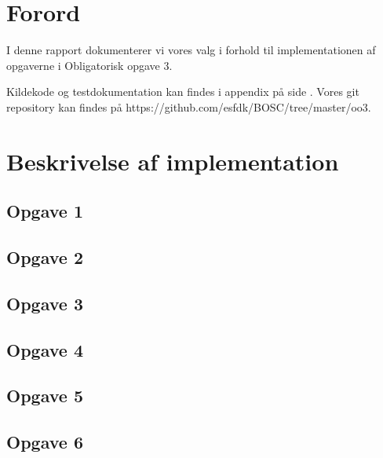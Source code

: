 \chapter{Forord}
I denne rapport dokumenterer vi vores valg i forhold til implementationen af opgaverne i Obligatorisk opgave 3.

Kildekode og testdokumentation kan findes i appendix på side \pageref{Appendix}. Vores git repository kan findes på https://github.com/esfdk/BOSC/tree/master/oo3.

\chapter{Beskrivelse af implementation}
\section{Opgave 1}
\label{O1}

\section{Opgave 2}
\label{O2}

\section{Opgave 3}
\label{O3}

\section{Opgave 4}
\label{O4}

\section{Opgave 5}
\label{O5}

\section{Opgave 6}
\label{O6}
